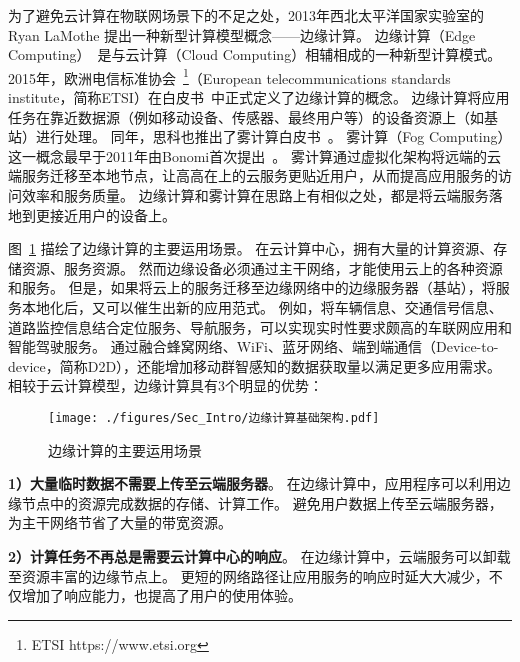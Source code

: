 为了避免云计算在物联网场景下的不足之处，2013年西北太平洋国家实验室的 Ryan LaMothe 提出一种新型计算模型概念——边缘计算。
边缘计算（Edge Computing）~\cite{DBLP:journals/cacm/ArmbrustFGJKKLPRSZ10}是与云计算（Cloud Computing）相辅相成的一种新型计算模式。
2015年，欧洲电信标准协会~\footnote{ETSI https://www.etsi.org}（European telecommunications standards institute，简称ETSI）在白皮书~\cite{hu2015mobile}中正式定义了边缘计算的概念。
边缘计算将应用任务在靠近数据源（例如移动设备、传感器、最终用户等）的设备资源上（如基站）进行处理。
同年，思科也推出了雾计算白皮书~\cite{computing2015internet}。
雾计算（Fog Computing）这一概念最早于2011年由Bonomi首次提出~\cite{bonomi2011connected}。
雾计算通过虚拟化架构将远端的云端服务迁移至本地节点，让高高在上的云服务更贴近用户，从而提高应用服务的访问效率和服务质量。
边缘计算和雾计算在思路上有相似之处，都是将云端服务落地到更接近用户的设备上。

图~\ref{Figure_EC_Architecture} 描绘了边缘计算的主要运用场景。
在云计算中心，拥有大量的计算资源、存储资源、服务资源。
然而边缘设备必须通过主干网络，才能使用云上的各种资源和服务。
但是，如果将云上的服务迁移至边缘网络中的边缘服务器（基站），将服务本地化后，又可以催生出新的应用范式。
例如，将车辆信息、交通信号信息、道路监控信息结合定位服务、导航服务，可以实现实时性要求颇高的车联网应用和智能驾驶服务。
通过融合蜂窝网络、WiFi、蓝牙网络、端到端通信（Device-to-device，简称D2D），还能增加移动群智感知的数据获取量以满足更多应用需求。
相较于云计算模型，边缘计算具有3个明显的优势：

\begin{figure}[!h]
  \centering
  \texttt{[image: ./figures/Sec\_Intro/边缘计算基础架构.pdf]}
  \vspace{-0.5em}
  \caption{边缘计算的主要运用场景}
  \vspace{-1em}
  \label{Figure_EC_Architecture}
\end{figure}

\textbf{1）大量临时数据不需要上传至云端服务器}。
在边缘计算中，应用程序可以利用边缘节点中的资源完成数据的存储、计算工作。
避免用户数据上传至云端服务器，为主干网络节省了大量的带宽资源。

\textbf{2）计算任务不再总是需要云计算中心的响应}。
在边缘计算中，云端服务可以卸载至资源丰富的边缘节点上。
更短的网络路径让应用服务的响应时延大大减少，不仅增加了响应能力，也提高了用户的使用体验。

